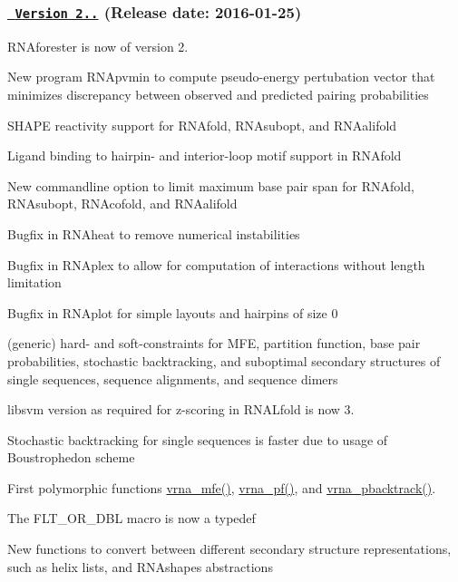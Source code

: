 \subsubsection*{\href{https://github.com/ViennaRNA/ViennaRNA/compare/v2.1.9...v2.2.0}{\texttt{ Version 2..}} (Release date\+: 2016-\/01-\/25)}


\begin{DoxyItemize}
\item R\+N\+Aforester is now of version 2.
\item New program R\+N\+Apvmin to compute pseudo-\/energy pertubation vector that minimizes discrepancy between observed and predicted pairing probabilities
\item S\+H\+A\+PE reactivity support for R\+N\+Afold, R\+N\+Asubopt, and R\+N\+Aalifold
\item Ligand binding to hairpin-\/ and interior-\/loop motif support in R\+N\+Afold
\item New commandline option to limit maximum base pair span for R\+N\+Afold, R\+N\+Asubopt, R\+N\+Acofold, and R\+N\+Aalifold
\item Bugfix in R\+N\+Aheat to remove numerical instabilities
\item Bugfix in R\+N\+Aplex to allow for computation of interactions without length limitation
\item Bugfix in R\+N\+Aplot for simple layouts and hairpins of size 0
\item (generic) hard-\/ and soft-\/constraints for M\+FE, partition function, base pair probabilities, stochastic backtracking, and suboptimal secondary structures of single sequences, sequence alignments, and sequence dimers
\item libsvm version as required for z-\/scoring in R\+N\+A\+Lfold is now 3.
\item Stochastic backtracking for single sequences is faster due to usage of Boustrophedon scheme
\item First polymorphic functions \mbox{\hyperlink{group__mfe__global_gabd3b147371ccf25c577f88bbbaf159fd}{vrna\+\_\+mfe()}}, \mbox{\hyperlink{group__part__func__global_ga29e256d688ad221b78d37f427e0e99bc}{vrna\+\_\+pf()}}, and \mbox{\hyperlink{group__subopt__stochbt_ga594844ac73c4e66e00d6791b31540634}{vrna\+\_\+pbacktrack()}}.
\item The F\+L\+T\+\_\+\+O\+R\+\_\+\+D\+BL macro is now a typedef
\item New functions to convert between different secondary structure representations, such as helix lists, and R\+N\+Ashapes abstractions

\end{DoxyItemize}
